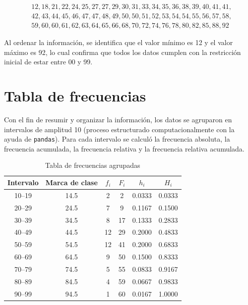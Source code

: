 \documentclass[12pt,letterpaper]{article}
\begin{document}
\begin{align*}
&12, 18, 21, 22, 24, 25, 27, 27, 29, 30, 31, 33, 34, 35, 36, 38, 39, 40, 41, 41, \\
&42, 43, 44, 45, 46, 47, 47, 48, 49, 50, 50, 51, 52, 53, 54, 54, 55, 56, 57, 58, \\
&59, 60, 60, 61, 62, 63, 64, 65, 66, 68, 70, 72, 74, 76, 78, 80, 82, 85, 88, 92
\end{align*}

Al ordenar la información, se identifica que el valor mínimo es 12 y el valor máximo es 92, lo cual confirma que todos los datos cumplen con la restricción inicial de estar entre 00 y 99.

\section{Tabla de frecuencias}

Con el fin de resumir y organizar la información, los datos se agruparon en intervalos de amplitud 10 (proceso estructurado computacionalmente con la ayuda de \texttt{pandas}). Para cada intervalo se calculó la frecuencia absoluta, la frecuencia acumulada, la frecuencia relativa y la frecuencia relativa acumulada.

\begin{table}[H]
\centering
\caption{Tabla de frecuencias agrupadas}
\begin{tabular}{cccccc}
\toprule
Intervalo & Marca de clase & $f_i$ & $F_i$ & $h_i$ & $H_i$ \\
\midrule
10--19 & 14.5 & 2  & 2  & 0.0333 & 0.0333 \\
20--29 & 24.5 & 7  & 9  & 0.1167 & 0.1500 \\
30--39 & 34.5 & 8  & 17 & 0.1333 & 0.2833 \\
40--49 & 44.5 & 12 & 29 & 0.2000 & 0.4833 \\
50--59 & 54.5 & 12 & 41 & 0.2000 & 0.6833 \\
60--69 & 64.5 & 9  & 50 & 0.1500 & 0.8333 \\
70--79 & 74.5 & 5  & 55 & 0.0833 & 0.9167 \\
80--89 & 84.5 & 4  & 59 & 0.0667 & 0.9833 \\
90--99 & 94.5 & 1  & 60 & 0.0167 & 1.0000 \\
\bottomrule
\end{tabular}
\end{table}
\end{document}
